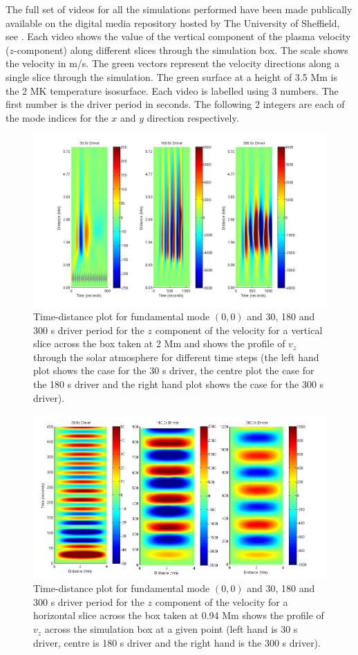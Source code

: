 \documentclass[preprint,authoryear,12pt]{elsarticle}
\begin{document}
The full set of videos for all the simulations performed have been made publically available on the digital media repository hosted by The University of Sheffield, see \citet{Griffiths2017}. Each video shows the value of the vertical component of the plasma velocity ($z$-component) along different slices through the simulation box. The scale shows the velocity in m/s. The green vectors represent the velocity directions along a single slice through the simulation. The green surface at a height of 3.5 Mm is the 2 MK temperature isosurface. 
Each video is labelled using 3 numbers. The first number is the driver period in seconds. The following 2 integers are each of the mode indices for the $x$ and $y$ direction respectively.
\begin{figure}[h]
\includegraphics[scale=0.4]{images/fig4_dt_30_180_300_0_vert_2Mm.jpg}
\caption{Time-distance plot for fundamental mode $(0,0)$ and 30, 180 and 300 s driver period for the $z$ component of the velocity for a vertical slice across the box  taken at 2 Mm and shows  the profile of $v_{z}$ through the solar atmosphere for different time steps (the left hand plot shows the case for the 30 s driver, the centre plot the case for the 180 s driver and the right hand plot shows the case for the 300 s  driver). }
\label{Fig3}
\end{figure}
\begin{figure}[h]
\includegraphics[scale=0.4]{images/fig5_dt_30_180_300_0_horiz_p94Mm.jpg}
\caption{Time-distance plot for fundamental mode $(0,0)$  and 30, 180 and 300 s driver period for the $z$ component of the velocity for a horizontal slice across the box  taken at 0.94 Mm shows  the profile of $ v_{z}$ across the simulation box at a given point (left hand is 30 s driver, centre is 180 s driver and the right hand is the 300 s driver). }
\label{Fig4}
\end{figure}
\end{document}
